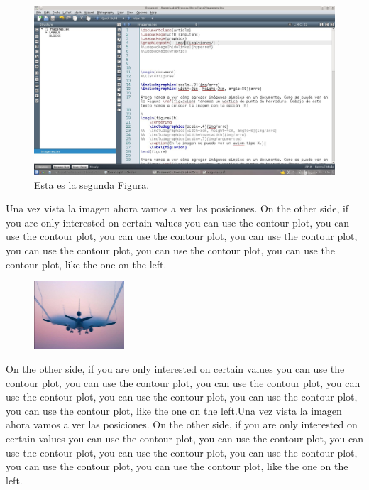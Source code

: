 \documentclass{report}
\begin{document}
\begin{figure}
	\centering
	\includegraphics[scale=.2]{images/arre}
	\caption{Esta es la segunda Figura.}
	\label{fig:aviones}
\end{figure}
%
%
Una vez vista la imagen ahora vamos a ver las posiciones. On the other side, if you are only interested on certain values you can use the contour plot, you can use the contour plot, you can use the contour plot, you can use the contour plot, you can use the contour plot, you can use the contour plot, you can use the contour plot, like the one on the left.\\

\begin{figure} %
    \centering
    \includegraphics[width=0.3\textwidth]{img/arre}
\end{figure}
 
On the other side, if you are only interested on certain values you can use the contour plot, you can use the contour plot, you can use the contour plot, you can use the contour plot, you can use the contour plot, you can use the contour plot, you can use the contour plot, like the one on the left.Una vez vista la imagen ahora vamos a ver las posiciones. On the other side, if you are only interested on certain values you can use the contour plot, you can use the contour plot, you can use the contour plot, you can use the contour plot, you can use the contour plot, you can use the contour plot, you can use the contour plot, like the one on the left.\\
\end{document}
